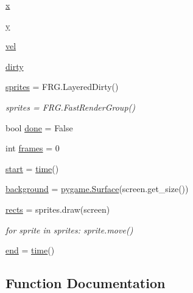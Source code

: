 \begin{DoxyCompactItemize}
\item 
\hyperlink{namespacepygame_1_1examples_1_1testsprite_a4a0a15567676c6344e1cff575472ca92}{x}
\item 
\hyperlink{namespacepygame_1_1examples_1_1testsprite_ada62b8a31487dd7a7c06dc113c85950a}{y}
\item 
\hyperlink{namespacepygame_1_1examples_1_1testsprite_a03e9a027b5d781aeebfeb683aa8fd370}{vel}
\item 
\hyperlink{namespacepygame_1_1examples_1_1testsprite_a0017c247c773b7dad5df001b8c4c6998}{dirty}
\item 
\hyperlink{namespacepygame_1_1examples_1_1testsprite_ad3a2cebc7488b71fe7203631fba390c1}{sprites} = F\+R\+G.\+Layered\+Dirty()
\begin{DoxyCompactList}\small\item\em sprites = F\+R\+G.\+Fast\+Render\+Group() \end{DoxyCompactList}\item 
bool \hyperlink{namespacepygame_1_1examples_1_1testsprite_ae0c30133af0c87e5339746df2996c112}{done} = False
\item 
int \hyperlink{namespacepygame_1_1examples_1_1testsprite_a40869084cb962c1c3817a5194d90a9c1}{frames} = 0
\item 
\hyperlink{namespacepygame_1_1examples_1_1testsprite_a60a9f2f34a76fc50db39329935111e03}{start} = \hyperlink{namespacepygame_a8bfece8a6e15e03662299926a400b0af}{time}()
\item 
\hyperlink{namespacepygame_1_1examples_1_1testsprite_a7127c9867e428966f72cc6cd7a1ebe18}{background} = \hyperlink{namespacepygame_af987790424fd0631c88919974993d66e}{pygame.\+Surface}(screen.\+get\+\_\+size())
\item 
\hyperlink{namespacepygame_1_1examples_1_1testsprite_a9738dc5c1954d6c4971f01fffe06f695}{rects} = sprites.\+draw(screen)
\begin{DoxyCompactList}\small\item\em for sprite in sprites\+: sprite.\+move() \end{DoxyCompactList}\item 
\hyperlink{namespacepygame_1_1examples_1_1testsprite_aaa8881c5b7f72b2bc493108cde5d52aa}{end} = \hyperlink{namespacepygame_a8bfece8a6e15e03662299926a400b0af}{time}()
\end{DoxyCompactItemize}


\subsection{Function Documentation}
\mbox{\label{namespacepygame_1_1examples_1_1testsprite_a7e3c7cf8928099e3811f6d57f20c0f43}} 
